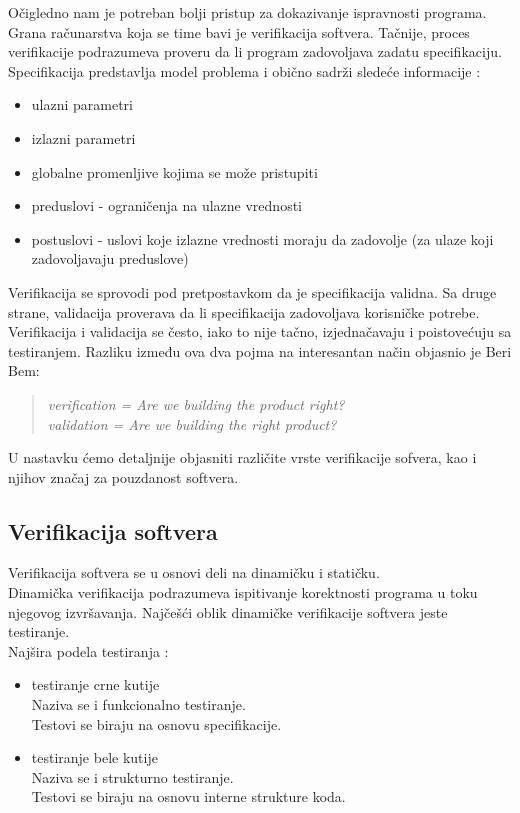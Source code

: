 \documentclass[a4paper]{article}
\begin{document}
Očigledno nam je potreban bolji pristup za dokazivanje ispravnosti programa.
Grana računarstva koja se time bavi je verifikacija softvera.
Tačnije, proces verifikacije podrazumeva proveru da li program zadovoljava zadatu specifikaciju.
Specifikacija predstavlja model problema i obično sadrži sledeće informacije \cite{laski2009software}:
\begin{itemize}
\item ulazni parametri
\item izlazni parametri
\item globalne promenljive kojima se može pristupiti
\item preduslovi - ograničenja na ulazne vrednosti
\item postuslovi - uslovi koje izlazne vrednosti moraju da zadovolje (za ulaze koji zadovoljavaju preduslove)
\end{itemize}
Verifikacija se sprovodi pod pretpostavkom da je specifikacija validna.
Sa druge strane, validacija proverava da li specifikacija zadovoljava korisničke potrebe.
Verifikacija i validacija se često, iako to nije tačno, izjednačavaju i poistovećuju sa testiranjem.
Razliku između ova dva pojma na interesantan način objasnio je Beri Bem:
\begin{quote}
\emph{verification = Are we building the product right? \\
validation = Are we building the right product?}
\end{quote}

U nastavku ćemo detaljnije objasniti različite vrste verifikacije sofvera, kao i njihov značaj za pouzdanost softvera.

\subsection{Verifikacija softvera}
\label{subsec:verifikacija}
Verifikacija softvera se u osnovi deli na dinamičku i statičku.\\
Dinamička verifikacija podrazumeva ispitivanje korektnosti programa u toku njegovog izvršavanja.
Najčešći oblik dinamičke verifikacije softvera jeste testiranje.\\
Najšira podela testiranja \cite{laski2009software}:
\begin{itemize}
\item testiranje crne kutije\\
Naziva se i funkcionalno testiranje.\\
Testovi se biraju na osnovu specifikacije.
\item testiranje bele kutije\\
Naziva se i strukturno testiranje.\\
Testovi se biraju na osnovu interne strukture koda.
\end{itemize}
\end{document}
